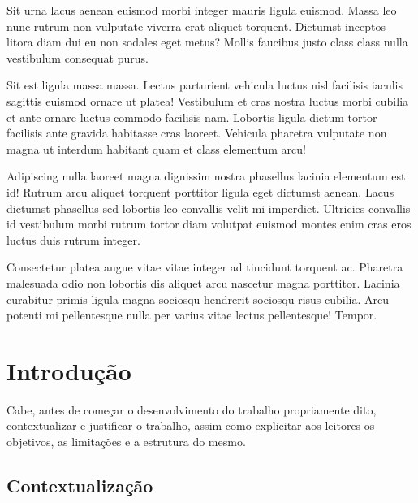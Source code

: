 \documentclass[grad,numbers]{coppe}
\begin{document}
  \begin{foreignabstract}
Sit urna lacus aenean euismod morbi integer mauris ligula euismod. Massa leo nunc rutrum non vulputate viverra erat aliquet torquent. Dictumst inceptos litora diam dui eu non sodales eget metus? Mollis faucibus justo class class nulla vestibulum consequat purus.

Sit est ligula massa massa. Lectus parturient vehicula luctus nisl facilisis iaculis sagittis euismod ornare ut platea! Vestibulum et cras nostra luctus morbi cubilia et ante ornare luctus commodo facilisis nam. Lobortis ligula dictum tortor facilisis ante gravida habitasse cras laoreet. Vehicula pharetra vulputate non magna ut interdum habitant quam et class elementum arcu!

Adipiscing nulla laoreet magna dignissim nostra phasellus lacinia elementum est id! Rutrum arcu aliquet torquent porttitor ligula eget dictumst aenean. Lacus dictumst phasellus sed lobortis leo convallis velit mi imperdiet. Ultricies convallis id vestibulum morbi rutrum tortor diam volutpat euismod montes enim cras eros luctus duis rutrum integer.

Consectetur platea augue vitae vitae integer ad tincidunt torquent ac. Pharetra malesuada odio non lobortis dis aliquet arcu nascetur magna porttitor. Lacinia curabitur primis ligula magna sociosqu hendrerit sociosqu risus cubilia. Arcu potenti mi pellentesque nulla per varius vitae lectus pellentesque! Tempor.
  \end{foreignabstract}
  \tableofcontents

  \listoffigures

  \listoftables

  \printlosymbols
  \printloabbreviations

  \mainmatter

  \hypertarget{introduuxe7uxe3o}{%
  \chapter{Introdução}\label{introduuxe7uxe3o}}
  
  Cabe, antes de começar o desenvolvimento do trabalho propriamente dito, contextualizar e justificar o trabalho, assim como explicitar aos leitores os objetivos, as limitações e a estrutura do mesmo.
  
  \hypertarget{contextualizauxe7uxe3o}{%
  \section{Contextualização}\label{contextualizauxe7uxe3o}}
  
\end{document}
